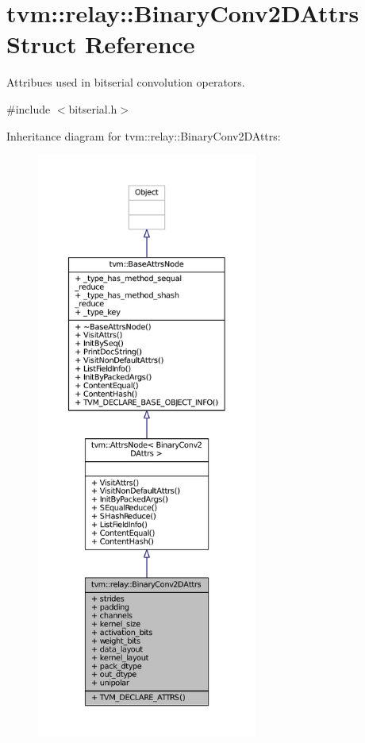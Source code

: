 \hypertarget{structtvm_1_1relay_1_1BinaryConv2DAttrs}{}\section{tvm\+:\+:relay\+:\+:Binary\+Conv2\+D\+Attrs Struct Reference}
\label{structtvm_1_1relay_1_1BinaryConv2DAttrs}


Attribues used in bitserial convolution operators.  




{\ttfamily \#include $<$bitserial.\+h$>$}



Inheritance diagram for tvm\+:\+:relay\+:\+:Binary\+Conv2\+D\+Attrs\+:
\nopagebreak
\begin{figure}[H]
\begin{center}
\leavevmode
\includegraphics[height=550pt]{structtvm_1_1relay_1_1BinaryConv2DAttrs__inherit__graph}
\end{center}
\end{figure}


